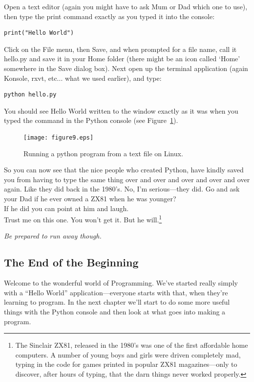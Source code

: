 \begin{LINUX}
Open a text editor (again you might have to ask Mum or Dad which one to use), then type the print command exactly as you typed it into the console:

\begin{listing}
\begin{verbatim}
print("Hello World")
\end{verbatim}
\end{listing}

Click on the File menu, then Save, and when prompted for a file name, call it hello.py and save it in your Home folder (there might be an icon called `Home' somewhere in the Save dialog box).  Next open up the terminal application (again Konsole, rxvt, etc... what we used earlier), and type:

\begin{listing}
\begin{verbatim}
python hello.py
\end{verbatim}
\end{listing}

You should see Hello World written to the window exactly as it was when you typed the command in the Python console (see Figure~\ref{fig9}).

\begin{figure}
\begin{center}
\texttt{[image: figure9.eps]}
\end{center}
\caption{Running a python program from a text file on Linux.}\label{fig9}
\end{figure}
\end{LINUX}

So you can now see that the nice people who created Python, have kindly saved you from having to type the same thing over and over and over and over and over again.  Like they did back in the 1980's.  No, I'm serious---they did.  Go and ask your Dad if he ever owned a ZX81 when he was younger?\\

\noindent
If he did you can point at him and laugh.\\

\noindent
Trust me on this one.  You won't get it.  But he will.\footnote{The Sinclair ZX81, released in the 1980's was one of the first affordable home computers.  A number of young boys and girls were driven completely mad, typing in the code for games printed in popular ZX81 magazines---only to discover, after hours of typing, that the darn things never worked properly.}

\noindent
\emph{Be prepared to run away though.}

\subsection*{\color{BrickRed}The End of the Beginning}

Welcome to the wonderful world of Programming.  We've started really simply with a ``Hello World'' application---everyone starts with that, when they're learning to program.
In the next chapter we'll start to do some more useful things with the Python console and then look at what goes into making a program.

\newpage
